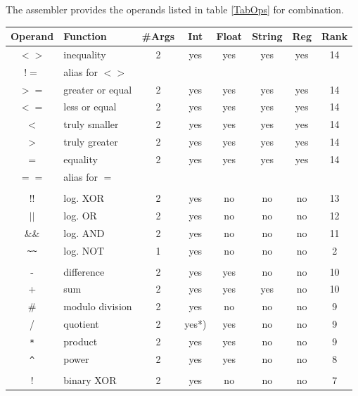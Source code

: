 \documentclass[12pt,twoside]{report}
\begin{document}
The assembler provides the operands listed in table \ref{TabOps} for
combination.
\begin{table}[htbp]
\begin{center}\begin{tabular}{|c|l|c|c|c|c|c|c|}
\hline
Operand & Function            & \#Args & Int & Float & String & Reg & Rank \\
\hline
\hline
$<>$        & inequality       & 2 & yes   & yes & yes & yes & 14 \\
$!=$        & alias for $<>$   &   &       &     &     &     &    \\
$>=$        & greater or equal & 2 & yes   & yes & yes & yes & 14 \\
$<=$        & less or equal    & 2 & yes   & yes & yes & yes & 14 \\
$<$         & truly smaller    & 2 & yes   & yes & yes & yes & 14 \\
$>$         & truly greater    & 2 & yes   & yes & yes & yes & 14 \\
$=$         & equality         & 2 & yes   & yes & yes & yes & 14 \\
$==$        & alias for $=$    &   &       &     &     &     &    \\
            & & & & & &  \\
$!!$        & log. XOR         & 2 & yes   & no  & no  & no  & 13 \\
$||$        & log. OR          & 2 & yes   & no  & no  & no  & 12 \\
\&\&        & log. AND         & 2 & yes   & no  & no  & no  & 11 \\
\verb! ~~ ! & log. NOT         & 1 & yes   & no  & no  & no  & 2 \\
            & & & & & &  \\
-           & difference       & 2 & yes   & yes & no  & no  & 10 \\
+           & sum              & 2 & yes   & yes & yes & no  & 10 \\
\#          & modulo division  & 2 & yes   & no  & no  & no  & 9 \\
/           & quotient         & 2 & yes*) & yes & no  & no  & 9 \\
\verb! * !  & product          & 2 & yes   & yes & no  & no  & 9 \\
\verb! ^ !  & power            & 2 & yes   & yes & no  & no  & 8 \\
            & & & & & &  \\
$!$         & binary XOR       & 2 & yes   & no  & no  & no  & 7 \\

\end{tabular}
\end{center}
\end{table}
\end{document}
